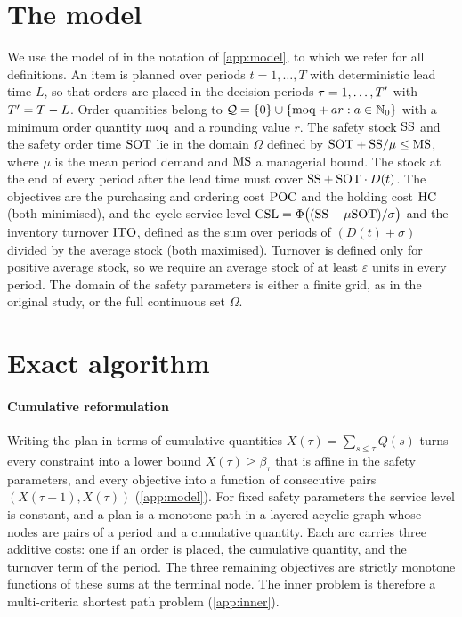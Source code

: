 \documentclass[preprint,12pt,authoryear]{elsarticle}
\begin{document}
\section{The model}\label{sec:model}

We use the model of \citet{Kania2022CIE} in the notation of \cref{app:model}, to which
we refer for all definitions. An item is planned over periods $t=1,\dots,T$ with
deterministic lead time $L$, so that orders are placed in the decision periods
$\tau=1,\dots,T'$ with $T'=T-L$. Order quantities belong to
$\mathcal{Q}=\{0\}\cup\{\mathrm{moq}+a r:a\in\mathbb{N}_0\}$ with a minimum order quantity $\mathrm{moq}$ and a
rounding value $r$. The safety stock $\mathrm{SS}$ and the safety order time $\mathrm{SOT}$ lie in the
domain $\Omega$ defined by $\mathrm{SOT}+\mathrm{SS}/\mu\le\mathrm{MS}$, where $\mu$ is the mean period demand
and $\mathrm{MS}$ a managerial bound. The stock at the end of every period after the lead time
must cover $\mathrm{SS}+\mathrm{SOT}\cdot D(t)$. The objectives are the purchasing and ordering cost
$\mathrm{POC}$ and the holding cost $\mathrm{HC}$ (both minimised), and the cycle service level
$\mathrm{CSL}=\Phi\bigl((\mathrm{SS}+\mu\mathrm{SOT})/\sigma\bigr)$ and the inventory turnover $\mathrm{ITO}$, defined as
the sum over periods of $(D(t)+\sigma)$ divided by the average stock (both maximised).
Turnover is defined only for positive average stock, so we require an average stock of
at least $\varepsilon$ units in every period. The domain of the safety parameters is
either a finite grid, as in the original study, or the full continuous set $\Omega$.

\section{Exact algorithm}\label{sec:method}

\paragraph{Cumulative reformulation}
Writing the plan in terms of cumulative quantities $X(\tau)=\sum_{s\le\tau}Q(s)$ turns
every constraint into a lower bound $X(\tau)\ge\beta_\tau$ that is affine in the safety
parameters, and every objective into a function of consecutive pairs
$(X(\tau-1),X(\tau))$ (\cref{app:model}). For fixed safety parameters the service level
is constant, and a plan is a monotone path in a layered acyclic graph whose nodes are
pairs of a period and a cumulative quantity. Each arc carries three additive costs: one
if an order is placed, the cumulative quantity, and the turnover term of the period. The
three remaining objectives are strictly monotone functions of these sums at the
terminal node. The inner problem is therefore a multi-criteria shortest path problem
(\cref{app:inner}).
\end{document}
